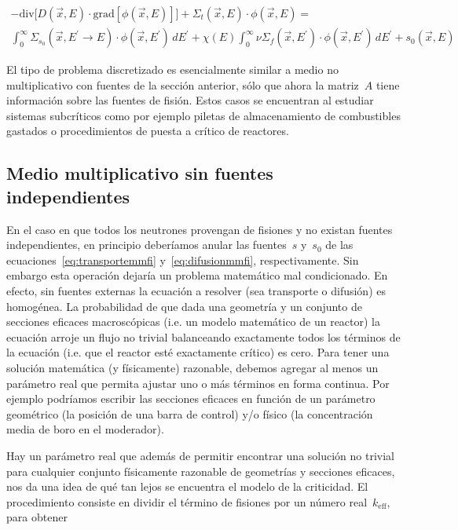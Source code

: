 \begin{multline}
\label{eq:difusionmmfi}
 - \text{div} \Big[ D(\vec{x}, E) \cdot \text{grad} \left[ \phi(\vec{x}, E) \right] \Big]
 + \Sigma_t(\vec{x}, E) \cdot \phi(\vec{x}, E)
 = \\
\int_{0}^{\infty} \Sigma_{s_0}(\vec{x}, E^{\prime} \rightarrow E)  \cdot \phi(\vec{x}, E^\prime) \, dE^\prime +
\chi(E) \int_{0}^{\infty} \nu\Sigma_f(\vec{x}, E^\prime) \cdot \phi(\vec{x}, E^\prime) \, dE^\prime
+ s_0(\vec{x}, E)
\end{multline}

El tipo de problema discretizado es esencialmente similar a medio no multiplicativo con fuentes de la sección anterior, sólo que ahora la matriz~$A$ tiene información sobre las fuentes de fisión. Estos casos se encuentran al estudiar sistemas subcríticos como por ejemplo piletas de almacenamiento de combustibles gastados o procedimientos de puesta a crítico de reactores. 


\subsection{Medio multiplicativo sin fuentes independientes} %

En el caso en que todos los neutrones provengan de fisiones y no existan fuentes independientes, en principio deberíamos anular las fuentes~$s$ y~$s_0$ de las ecuaciones~\eqref{eq:transportemmfi} y~\eqref{eq:difusionmmfi}, respectivamente. Sin embargo esta operación dejaría un problema matemático mal condicionado. En efecto, sin fuentes externas la ecuación a resolver (sea transporte o difusión) es homogénea. La probabilidad de que dada una geometría y un conjunto de secciones eficaces macroscópicas (i.e. un modelo matemático de un reactor) la ecuación arroje un flujo no trivial balanceando exactamente todos los términos de la ecuación (i.e. que el reactor esté exactamente crítico) es cero. Para tener una solución matemática (y físicamente) razonable, debemos agregar al menos un parámetro real que permita ajustar uno o más términos en forma continua. Por ejemplo podríamos escribir las secciones eficaces en función de un parámetro geométrico (la posición de una barra de control) y/o físico (la concentración media de boro en el moderador).

Hay un parámetro real que además de permitir encontrar una solución no trivial para cualquier conjunto físicamente razonable de geometrías y secciones eficaces, nos da una idea de qué tan lejos se encuentra el modelo de la criticidad. El procedimiento consiste en dividir el término de fisiones por un número real~$k_\text{eff}$, para obtener


